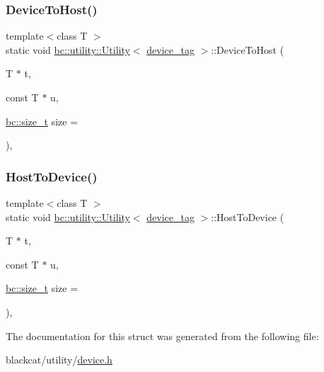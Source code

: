 \subsubsection{\texorpdfstring{Device\+To\+Host()}{DeviceToHost()}}
{\footnotesize\ttfamily template$<$class T $>$ \\
static void \hyperlink{structbc_1_1utility_1_1Utility}{bc\+::utility\+::\+Utility}$<$ \hyperlink{structbc_1_1device__tag}{device\+\_\+tag} $>$\+::Device\+To\+Host (\begin{DoxyParamCaption}\item[{T $\ast$}]{t,  }\item[{const T $\ast$}]{u,  }\item[{\hyperlink{namespacebc_aaf8e3fbf99b04b1b57c4f80c6f55d3c5}{bc\+::size\+\_\+t}}]{size = {} }\end{DoxyParamCaption})\hspace{0.3cm}{\ttfamily [inline]}, {\ttfamily [static]}}

\mbox{\label{structbc_1_1utility_1_1Utility_3_01device__tag_01_4_a5352c653d9f17045046ec8359f52127a}} 
\subsubsection{\texorpdfstring{Host\+To\+Device()}{HostToDevice()}}
{\footnotesize\ttfamily template$<$class T $>$ \\
static void \hyperlink{structbc_1_1utility_1_1Utility}{bc\+::utility\+::\+Utility}$<$ \hyperlink{structbc_1_1device__tag}{device\+\_\+tag} $>$\+::Host\+To\+Device (\begin{DoxyParamCaption}\item[{T $\ast$}]{t,  }\item[{const T $\ast$}]{u,  }\item[{\hyperlink{namespacebc_aaf8e3fbf99b04b1b57c4f80c6f55d3c5}{bc\+::size\+\_\+t}}]{size = {} }\end{DoxyParamCaption})\hspace{0.3cm}{\ttfamily [inline]}, {\ttfamily [static]}}



The documentation for this struct was generated from the following file\+:\begin{DoxyCompactItemize}
\item 
blackcat/utility/\hyperlink{utility_2device_8h}{device.\+h}\end{DoxyCompactItemize}
